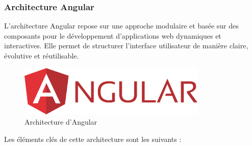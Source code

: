 \subsubsection{Architecture Angular}

L’architecture Angular repose sur une approche modulaire et basée sur des composants pour le développement d’applications web dynamiques et interactives. Elle permet de structurer l’interface utilisateur de manière claire, évolutive et réutilisable.

\begin{figure}[H]
    \centering
    \includegraphics[width=0.8\textwidth]{figures/angular.png}
    \caption{Architecture d’Angular}
    \label{fig:architecture_angular}
\end{figure}

Les éléments clés de cette architecture sont les suivants :


